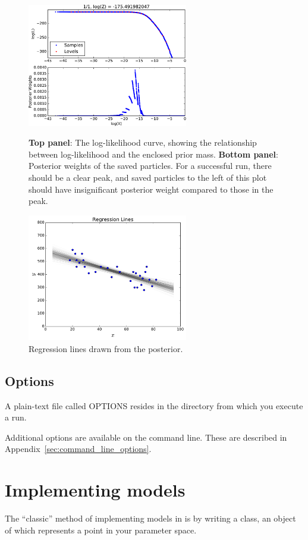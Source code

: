 \documentclass[article]{jss}
\begin{document}
\begin{figure}[ht!]
\begin{minipage}{7.5cm}
\includegraphics[width=7cm]{figures/fig3.pdf}
\caption{{\bf Top panel}: The log-likelihood curve, showing the relationship
between log-likelihood and the enclosed prior mass.
{\bf Bottom panel}: Posterior weights of the saved particles.
For a successful run, there should be a clear peak, and saved particles
to the left of this plot should have insignificant posterior weight compared
to those in the peak.
\label{fig:fig3}}
\end{minipage}\hspace{0.5cm}
\begin{minipage}{7.5cm}
\includegraphics[width=7cm]{figures/regression_lines.pdf}
\caption{Regression lines drawn from the posterior.
\label{fig:regression_lines}}
\end{minipage}
\end{figure}

\subsection{Options}
A plain-text file called OPTIONS resides in the directory from which you
execute a run.

Additional options are available on the command line. These are
described in Appendix~\ref{sec:command_line_options}.

\section{Implementing models}\label{sec:models}
The ``classic'' method of implementing models in  is by
writing a  class, an object of which represents a
point in your parameter space.
\end{document}
